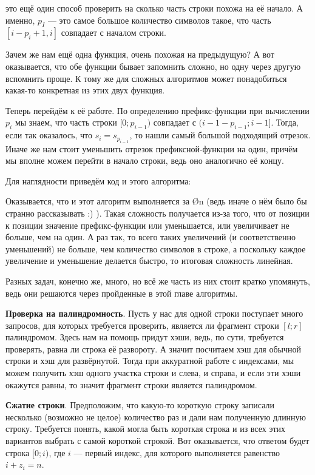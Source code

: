 

 это ещё один способ проверить на сколько часть строки похожа на её начало. А именно, $p_I$ — это самое большое количество символов такое, что часть $[i - p_i + 1, i]$ совпадает с началом строки.

Зачем же нам ещё одна функция, очень похожая на предыдущую? А вот оказывается, что обе функции бывает запомнить сложно, но одну через другую вспомнить проще. К тому же для сложных алгоритмов может понадобиться какая-то конкретная из этих двух функция.

Теперь перейдём к её работе. По определению префикс-функции при вычислении $p_i$ мы знаем, что часть строки $[0; p_{i - 1})$ совпадает с $(i - 1 - p_{i - 1}; i - 1]$. Тогда, если так оказалось, что $s_i = s_{p_{i - 1}}$, то нашли самый большой подходящий отрезок. Иначе же нам стоит уменьшить отрезок префиксной-функции на один, причём мы вполне можем перейти в начало строки, ведь оно аналогично её концу.

Для наглядности приведём код и этого алгоритма:


Оказывается, что и этот алгоритм выполняется за \O{n} (ведь иначе о нём было бы странно рассказывать :) ). Такая сложность получается из-за того, что от позиции к позиции значение префикс-функции или уменьшается, или увеличивает не больше, чем на один. А раз так, то всего таких увеличений (и соответственно уменьшений) не больше, чем количество символов в строке, а поскольку каждое увеличение и уменьшение делается быстро, то итоговая сложность линейная.


Разных задач, конечно же, много, но всё же часть из них стоит кратко упомянуть, ведь они решаются через пройденные в этой главе алгоритмы. 

\textbf{Проверка на палиндромность}. Пусть у нас для одной строки поступает много запросов, для которых требуется проверить, является ли фрагмент строки $[l; r]$ палиндромом. Здесь нам на помощь придут хэши, ведь, по сути, требуется проверять, равна ли строка её развороту. А значит посчитаем хэш для обычной строки и хэш для развёрнутой. Тогда при аккуратной работе с индексами, мы можем получить хэш одного участка строки и слева, и справа, и если эти хэши окажутся равны, то значит фрагмент строки является палиндромом.

\textbf{Сжатие строки}. Предположим, что какую-то короткую строку записали несколько (возможно не целое) количество раз и дали нам полученную длинную строку. Требуется понять, какой могла быть короткая строка и из всех этих вариантов выбрать с самой короткой строкой. Вот оказывается, что ответом будет строка $[0; i)$, где $i$ — первый индекс, для которого выполняется равенство $i + z_i = n$.

